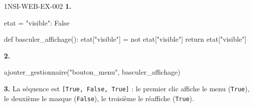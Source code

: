 \begin{corrige}{1NSI-WEB-EX-002}
\textbf{1.}
\begin{python}
etat = {"visible": False}

def basculer_affichage():
    etat["visible"] = not etat["visible"]
    return etat["visible"]
\end{python}

\textbf{2.}
\begin{python}
ajouter_gestionnaire("bouton_menu", basculer_affichage)
\end{python}

\textbf{3.} La séquence est \lstinline{[True, False, True]} : le premier clic affiche le
menu (\lstinline{True}), le deuxième le masque (\lstinline{False}), le troisième le
réaffiche (\lstinline{True}).
\end{corrige}
